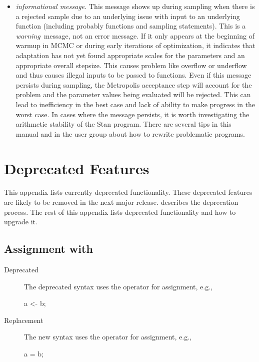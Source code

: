 \begin{itemize}
\item {\it informational message.}  This message shows up during
  sampling when there is a rejected sample due to an underlying issue
  with input to an underlying function (including probably functions
  and sampling statements).  This is a {\it warning}\, message, not an
  error message.  If it only appears at the beginning of warmup in
  MCMC or during early iterations of optimization, it indicates that
  adaptation has not yet found appropriate scales for the parameters
  and an appropriate overall stepsize.  This causes problem like
  overflow or underflow and thus causes illegal inputs to be passed to
  functions.  Even if this message persists during sampling, the
  Metropolis acceptance step will account for the problem and the
  parameter values being evaluated will be rejected.  This can lead to
  inefficiency in the best case and lack of ability to make progress
  in the worst case.  In cases where the message persists, it is worth
  investigating the arithmetic stability of the Stan program.  There
  are several tips in this manual and in the user group about how to
  rewrite problematic programs.
\end{itemize}

\chapter{Deprecated Features}\label{deprecated-features.appendix}

\noindent
This appendix lists currently deprecated functionality.  These
deprecated features are likely to be removed in the next major
release.   describes the deprecation
process.  The rest of this appendix lists deprecated functionality and
how to upgrade it.

\section{Assignment with \code{<-}}

\begin{description}
\item[Deprecated] The deprecated syntax uses the operator \code{<-}
  for assignment, e.g., 
\begin{stancode}
a <- b;
\end{stancode}
\item[Replacement] The new syntax uses the operator \code{=} for
  assignment, e.g.,
\begin{stancode}
a = b;
\end{stancode}
\end{description}

